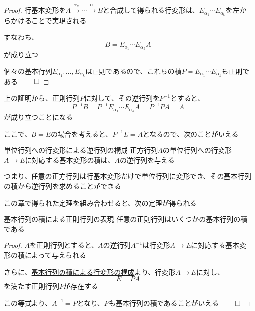 \documentclass[../../../topic_linear-algebra]{subfiles}
\begin{document}
\begin{proof}
  行基本変形を$A \xrightarrow{\alpha_k} \cdots \xrightarrow{\alpha_1} B$と合成して得られる行変形は、$E_{\alpha_1} \cdots E_{\alpha_k}$を左からかけることで実現される

  すなわち、
  \begin{equation*}
    B = E_{\alpha_1} \cdots E_{\alpha_k} A
  \end{equation*}
  が成り立つ

  個々の基本行列$E_{\alpha_1},\ldots,E_{\alpha_k}$は正則であるので、これらの積$P = E_{\alpha_1} \cdots E_{\alpha_k}$も正則である $\qed$
\end{proof}

\br

上の証明から、正則行列$P$に対して、その逆行列を$P^{-1}$とすると、
\begin{equation*}
  P^{-1}B = P^{-1}E_{\alpha_1} \cdots E_{\alpha_k} A = P^{-1}PA = A
\end{equation*}
が成り立つことになる

\br

ここで、$B = E$の場合を考えると、$P^{-1}E = A$となるので、次のことがいえる

\begin{theorem}{単位行列への行変形による逆行列の構成}
  正方行列$A$の単位行列への行変形$A \to E$に対応する基本変形の積は、$A$の逆行列を与える
\end{theorem}

つまり、任意の正方行列は行基本変形だけで単位行列に変形でき、その基本行列の積から逆行列を求めることができる

\sectionline

この章で得られた定理を組み合わせると、次の定理が得られる

\begin{theorem}{基本行列の積による正則行列の表現}\label{thm:invertible-as-product-of-elementary}
  任意の正則行列はいくつかの基本行列の積である
\end{theorem}

\begin{proof}
  $A$を正則行列とすると、$A$の逆行列$A^{-1}$は行変形$A \to E$に対応する基本変形の積によって与えられる

  さらに、\hyperref[thm:row-operation-by-elementary-matrices]{基本行列の積による行変形の構成}より、行変形$A \to E$に対し、
  \begin{equation*}
    E = PA
  \end{equation*}
  を満たす正則行列$P$が存在する

  この等式より、$A^{-1} = P$となり、$P$も基本行列の積であることがいえる $\qed$
\end{proof}
\end{document}
